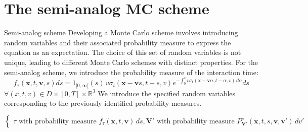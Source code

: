 \documentclass{beamer}
\def\\{}%
\begin{document}
	\section{The semi-analog MC scheme}
	\begin{frame}{Semi-analog scheme}
		Developing a Monte Carlo scheme involves introducing random variables and their associated probability measure to express the equation as an expectation. The choice of this set of random variables is not unique, leading to different Monte Carlo schemes with distinct properties.\\
		For the semi-analog scheme, we introduce the probability measure of the interaction time: 
		\begin{equation*}
			f_{\tau}(\textbf{x}, t, \textbf{v}, s) ds = 1_{[0,\infty[}(s) \, v\sigma_t(\textbf{x} - \textbf{v}s, t - s, v) e^{-\int_{0}^s v\sigma_t(\textbf{x} - \textbf{v}\alpha, t - \alpha, v) \, d\alpha} ds
		\end{equation*}
		$ \forall (x, t, v) \in D \times [0, T] \times \mathbb{R}^3$\\
		We introduce the specified random variables corresponding to the previously identified probability measures.
		
		\begin{equation*}
			\left\{
			\begin{array}{ll}
				\tau \text{ with probability measure } f_{\tau}(\textbf{x}, t, \textbf{v}) \, ds, \\
				\textbf{V}' \text{ with probability measure } P_{\textbf{V}'}^{s}(\textbf{x}, t, s, \textbf{v}, \textbf{v}') \, dv'
			\end{array}
			\right.
		\end{equation*}
		
		
	\end{frame}
\end{document}
